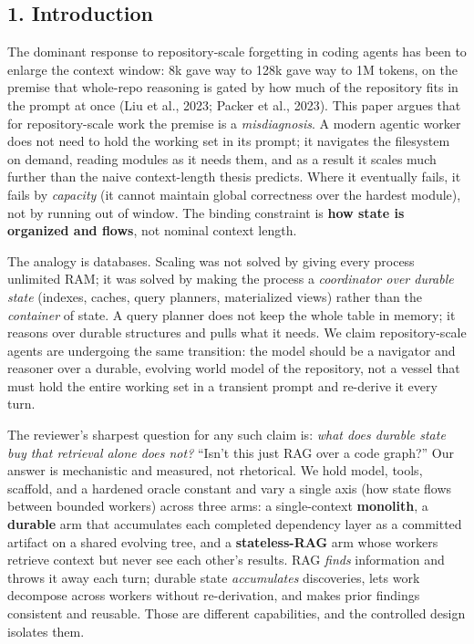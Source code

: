 \documentclass[
  10pt,
]{article}
\begin{document}
\subsection{1. Introduction}\label{introduction}

The dominant response to repository-scale forgetting in coding agents
has been to enlarge the context window: 8k gave way to 128k gave way to
1M tokens, on the premise that whole-repo reasoning is gated by how much
of the repository fits in the prompt at once (Liu et al., 2023; Packer
et al., 2023). This paper argues that for repository-scale work the
premise is a \emph{misdiagnosis}. A modern agentic worker does not need
to hold the working set in its prompt; it navigates the filesystem on
demand, reading modules as it needs them, and as a result it scales much
further than the naive context-length thesis predicts. Where it
eventually fails, it fails by \emph{capacity} (it cannot maintain global
correctness over the hardest module), not by running out of window. The
binding constraint is \textbf{how state is organized and flows}, not
nominal context length.

The analogy is databases. Scaling was not solved by giving every process
unlimited RAM; it was solved by making the process a \emph{coordinator
over durable state} (indexes, caches, query planners, materialized
views) rather than the \emph{container} of state. A query planner does
not keep the whole table in memory; it reasons over durable structures
and pulls what it needs. We claim repository-scale agents are undergoing
the same transition: the model should be a navigator and reasoner over a
durable, evolving world model of the repository, not a vessel that must
hold the entire working set in a transient prompt and re-derive it every
turn.

The reviewer's sharpest question for any such claim is: \emph{what does
durable state buy that retrieval alone does not?} ``Isn't this just RAG
over a code graph?'' Our answer is mechanistic and measured, not
rhetorical. We hold model, tools, scaffold, and a hardened oracle
constant and vary a single axis (how state flows between bounded
workers) across three arms: a single-context \textbf{monolith}, a
\textbf{durable} arm that accumulates each completed dependency layer as
a committed artifact on a shared evolving tree, and a
\textbf{stateless-RAG} arm whose workers retrieve context but never see
each other's results. RAG \emph{finds} information and throws it away
each turn; durable state \emph{accumulates} discoveries, lets work
decompose across workers without re-derivation, and makes prior findings
consistent and reusable. Those are different capabilities, and the
controlled design isolates them.
\end{document}

